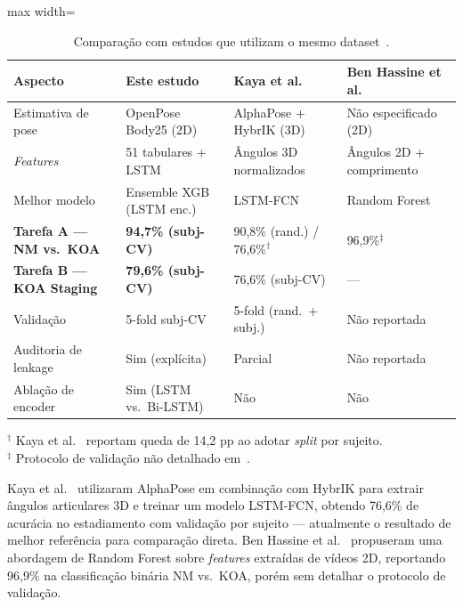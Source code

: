\documentclass[a4paper,12pt]{article}
\begin{document}
\begin{table}[H]
  \centering
  \caption{Comparação com estudos que utilizam o mesmo dataset~\cite{Kour2022}.}
  \label{tab:comp}
  \small
  \begin{adjustbox}{max width=\textwidth}
  \begin{tabular}{@{}llll@{}}
    \toprule
    \textbf{Aspecto} &
    \textbf{Este estudo} &
    \textbf{Kaya et al.~\cite{Kaya2025}} &
    \textbf{Ben Hassine et al.~\cite{BenHassine2024}} \\
    \midrule
    Estimativa de pose &
      OpenPose Body25 (2D) &
      AlphaPose + HybrIK (3D) &
      Não especificado (2D) \\
    \textit{Features} &
      51 tabulares + LSTM &
      Ângulos 3D normalizados &
      Ângulos 2D + comprimento \\
    Melhor modelo &
      Ensemble XGB (LSTM enc.) &
      LSTM-FCN &
      Random Forest \\
    \textbf{Tarefa A --- NM vs.\ KOA} &
      \textbf{94,7\% (subj-CV)} &
      90,8\% (rand.) / 76,6\%$^\dagger$ &
      96,9\%$^\ddagger$ \\
    \textbf{Tarefa B --- KOA Staging} &
      \textbf{79,6\% (subj-CV)} &
      76,6\% (subj-CV) &
      --- \\
    Validação &
      5-fold subj-CV &
      5-fold (rand.\ + subj.) &
      Não reportada \\
    Auditoria de leakage &
      Sim (explícita) &
      Parcial &
      Não reportada \\
    Ablação de encoder &
      Sim (LSTM vs.\ Bi-LSTM) &
      Não &
      Não \\
    \bottomrule
  \end{tabular}
  \end{adjustbox}
  \vspace{4pt}

  {\footnotesize
  $^\dagger$ Kaya et al.~\cite{Kaya2025} reportam queda de 14,2 pp ao adotar
  \textit{split} por sujeito.\\
  $^\ddagger$ Protocolo de validação não detalhado em~\cite{BenHassine2024}.}
\end{table}

Kaya et al.~\cite{Kaya2025} utilizaram AlphaPose em combinação com HybrIK para
extrair ângulos articulares 3D e treinar um modelo LSTM-FCN, obtendo 76,6\% de
acurácia no estadiamento com validação por sujeito --- atualmente o resultado de
melhor referência para comparação direta. Ben Hassine et al.~\cite{BenHassine2024}
propuseram uma abordagem de Random Forest sobre \textit{features} extraídas de vídeos
2D, reportando 96,9\% na classificação binária NM vs.\ KOA, porém sem detalhar o
protocolo de validação.
\end{document}
